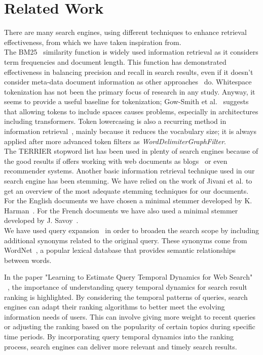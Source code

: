 \section{Related Work}
\label{sec:related}

There are many search engines, using different techniques to enhance retrieval effectiveness, from which we have taken
inspiration from.\\

The BM25~\cite{BM25} similarity function is widely used information retrieval as it considers term frequencies and document length.
This function has demonstrated effectiveness in balancing precision and recall in search results, even if it
doesn't consider meta-data document information as other approaches~\cite{robertson2009probabilistic} do.
Whitespace tokenization has not been the primary focus of research in any study.
Anyway, it seems to provide a useful baseline for tokenization;
Gow-Smith et al.~\cite{gowsmith2022improving} suggests that allowing tokens to include spaces causes problems,
especially in architectures including transformers.
Token lowercasing is also a recurring method in information retrieval~\cite{manning2008introduction}, mainly because it
reduces the vocabulary size;
it is always applied after more advanced token filters as \textit{WordDelimiterGraphFilter}.\\

The TERRIER stopword list has been used in plenty of search engines because of the good results if offers working with
web documents as blogs~\cite{Ounis2006OverviewOT} or even recommender systems.
Another basic information retrieval technique used in our search engine has been stemming.
We have relied on the work of Jivani et al.\cite{jivani2011comparative} to get an overview of the most adequate stemming
techniques for our documents.
For the English documents we have chosen a minimal stemmer developed by K. Harman~\cite{Harman1991HowEI}.
For the French documents we have also used a minimal stemmer developed by J. Savoy~\cite{frenchStemmer}.
\\

We have used query expansion~\cite{efthimiadis1996query} in order to broaden the search scope by including additional
synonyms related to the original query.
These synonyms come from WordNet~\cite{Fellbaum1998}, a popular lexical database that provides semantic relationships
between words.

In the paper "Learning to Estimate Query Temporal Dynamics for Web Search" ~\cite{cai2014learning}, the importance of
understanding query temporal dynamics for search result ranking is highlighted.
By considering the temporal patterns of queries, search engines can adapt their ranking algorithms to better meet the
evolving information needs of users.
This can involve giving more weight to recent queries or adjusting the ranking based on the popularity of certain topics
during specific time periods.
By incorporating query temporal dynamics into the ranking process, search engines can deliver more relevant and timely
search results.\\

